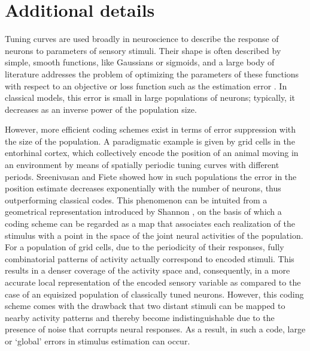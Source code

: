 \documentclass[a4paper]{article}%
\begin{document}
\section{Additional details}

Tuning curves are used broadly in neuroscience to describe
the response of neurons to parameters of sensory stimuli. Their shape is often
described by simple, smooth functions, like Gaussians or sigmoids,
and a large body of literature addresses the problem of optimizing
the parameters of these functions with respect to an objective or loss
function such as the estimation error \cite{Zhang1999NeuronalBroaden}.
In classical models, this error is small in large populations of
neurons; typically, it decreases as an inverse power of the population size.

However, more efficient coding schemes exist in terms of error suppression
with the size of the population. A paradigmatic example is given by grid cells
in the entorhinal cortex, which collectively encode the position of an animal
moving in an environment by means of spatially periodic tuning curves with
different periods. Sreenivasan and Fiete \cite{Sreenivasan2011GridComputation}
showed how in such populations the error in the position estimate decreases
exponentially with the number of neurons, thus outperforming classical codes.
This phenomenon can be intuited from a geometrical representation
introduced by Shannon 
\cite{Shannon1949CommunicationNoise}, on the basis of which a coding scheme
can be regarded as a map that associates each realization of the stimulus with
a point in the space of the joint neural activities of the population. For a
population of grid cells, due to the periodicity of their responses,
fully combinatorial patterns of activity actually 
 correspond to  encoded stimuli. This results in a
denser coverage of the activity space and, consequently, in a more
accurate local representation of the encoded sensory variable as compared to
the case of an equisized population of classically tuned neurons.
However, this coding scheme comes with the drawback that two
distant stimuli can be mapped to nearby activity patterns and
thereby become indistinguishable due to the presence of noise that
corrupts neural responses. As a result, in such a code, large or
`global' errors in stimulus estimation can occur.
\end{document}
